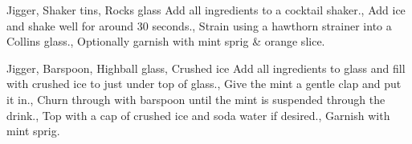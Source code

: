 \documentclass[../main.tex]{subfiles}
\begin{document}
\cocktailDivider

{Jigger, Shaker tins, Rocks glass}
{
    Add all ingredients to a cocktail shaker.,
    Add ice and shake well for around 30 seconds.,
    Strain using a hawthorn strainer into a Collins glass.,
    Optionally garnish with mint sprig \& orange slice.
}

\cocktailDivider


%
{Jigger, Barspoon, Highball glass, Crushed ice}
%
{
    Add all ingredients to glass and fill with crushed ice to just under top of glass.,
    {Give the mint a gentle clap and put it in.},
    {Churn through with barspoon until the mint is suspended through the drink.},
    Top with a cap of crushed ice and soda water if desired.,
    {Garnish with mint sprig.}
}
\end{document}
